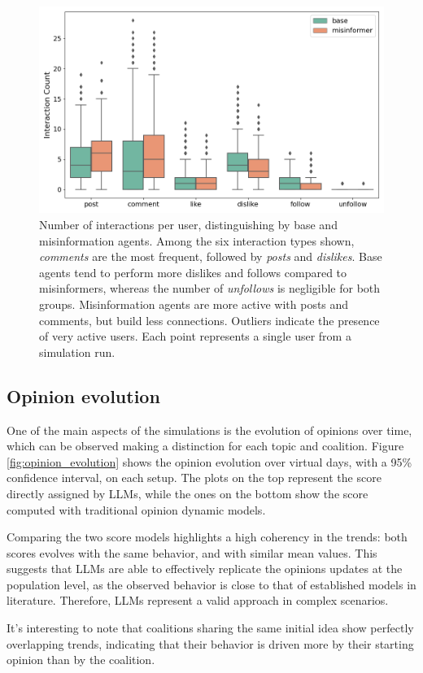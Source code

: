 \begin{figure}[h]
    \centering
    \includegraphics[width=0.6\linewidth]{Images/Interactions/count_per_user_DefaultRecSys.png}
    \caption{Number of interactions per user, distinguishing by base and misinformation agents.
    Among the six interaction types shown, \textit{comments} are the most frequent, followed by \textit{posts} and \textit{dislikes}.
    Base agents tend to perform more dislikes and follows compared to misinformers, whereas the number of \textit{unfollows} is negligible for both groups.
    Misinformation agents are more active with posts and comments, but build less connections.
    Outliers indicate the presence of very active users.
    Each point represents a single user from a simulation run.}
    \label{fig:interactions_count}
\end{figure}


\subsection{Opinion evolution}
One of the main aspects of the simulations is the evolution of opinions over time, which can be observed making a distinction for each topic and coalition.
Figure \ref{fig:opinion_evolution} shows the opinion evolution over virtual days, with a 95\% confidence interval, on each setup.
The plots on the top represent the score directly assigned by LLMs, while the ones on the bottom show the score computed with traditional opinion dynamic models.

Comparing the two score models highlights a high coherency in the trends: both scores evolves with the same behavior, and with similar mean values.
This suggests that LLMs are able to effectively replicate the opinions updates at the population level, as the observed behavior is close to that of established models in literature. Therefore, LLMs represent a valid approach in complex scenarios.

It's interesting to note that coalitions sharing the same initial idea show perfectly overlapping trends, indicating that their behavior is driven more by their starting opinion than by the coalition.

